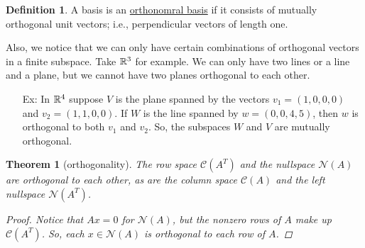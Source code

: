 \documentclass[reqno]{amsart}
\newtheorem{thm}{Theorem}
\theoremstyle{definition}
\newtheorem{definition}{Definition}
\begin{document}
\begin{definition}
A basis is an \underline{\color{red}orthonomral basis} if it consists of mutually orthogonal unit vectors; i.e., perpendicular
vectors of length one.
\end{definition}

Also, we notice that we can only have certain combinations of orthogonal vectors in a finite subspace.
Take $\mathbb{R}^3$ for example.  We can only have two lines or a line and a plane, but we cannot have two planes
orthogonal to each other.

\begin{itemize}

\item[Ex:  ]  In $\mathbb{R}^4$ suppose $V$ is the plane spanned by the vectors $v_1 = (1,0,0,0)$ and $v_2 = (1,1,0,0)$.  If $W$ is the line spanned by $w = (0,0,4,5)$, then $w$ is orthogonal to both $v_1$ and $v_2$.  So, the subspaces $W$ and $V$ are mutually orthogonal.

\end{itemize}

\begin{thm}[orthogonality]
The row space $\mathcal{C}(A^T)$ and the nullspace $\mathcal{N}(A)$ are orthogonal to each other, as are
the column space $\mathcal{C}(A)$ and the left nullspace $\mathcal{N}(A^T)$.

\begin{proof}
Notice that $Ax = 0$ for $\mathcal{N}(A)$, but the nonzero rows of $A$ make up $\mathcal{C}(A^T)$.
So, each $x \in \mathcal{N}(A)$ is orthogonal to each row of $A$.
\end{proof}
\end{thm}
\end{document}

